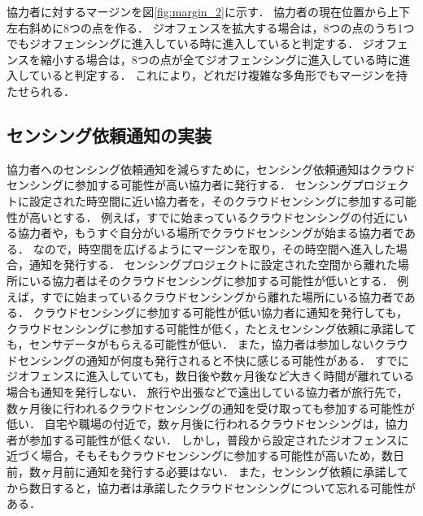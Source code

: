 協力者に対するマージンを図\ref{fig:margin_2}に示す．
協力者の現在位置から上下左右斜めに8つの点を作る．
ジオフェンスを拡大する場合は，8つの点のうち1つでもジオフェンシングに進入している時に進入していると判定する．
ジオフェンスを縮小する場合は，8つの点が全てジオフェンシングに進入している時に進入していると判定する．
これにより，どれだけ複雑な多角形でもマージンを持たせられる．






\subsection{センシング依頼通知の実装}
\label{myApp_notify}
協力者へのセンシング依頼通知を減らすために，センシング依頼通知はクラウドセンシングに参加する可能性が高い協力者に発行する．
センシングプロジェクトに設定された時空間に近い協力者を，そのクラウドセンシングに参加する可能性が高いとする．
例えば，すでに始まっているクラウドセンシングの付近にいる協力者や，もうすぐ自分がいる場所でクラウドセンシングが始まる協力者である．
なので，時空間を広げるようにマージンを取り，その時空間へ進入した場合，通知を発行する．
センシングプロジェクトに設定された空間から離れた場所にいる協力者はそのクラウドセンシングに参加する可能性が低いとする．
例えば，すでに始まっているクラウドセンシングから離れた場所にいる協力者である．
クラウドセンシングに参加する可能性が低い協力者に通知を発行しても，クラウドセンシングに参加する可能性が低く，たとえセンシング依頼に承諾しても，センサデータがもらえる可能性が低い．
また，協力者は参加しないクラウドセンシングの通知が何度も発行されると不快に感じる可能性がある．
すでにジオフェンスに進入していても，数日後や数ヶ月後など大きく時間が離れている場合も通知を発行しない．
旅行や出張などで遠出している協力者が旅行先で，数ヶ月後に行われるクラウドセンシングの通知を受け取っても参加する可能性が低い．
自宅や職場の付近で，数ヶ月後に行われるクラウドセンシングは，協力者が参加する可能性が低くない．
しかし，普段から設定されたジオフェンスに近づく場合，そもそもクラウドセンシングに参加する可能性が高いため，数日前，数ヶ月前に通知を発行する必要はない．
また，センシング依頼に承諾してから数日すると，協力者は承諾したクラウドセンシングについて忘れる可能性がある．

